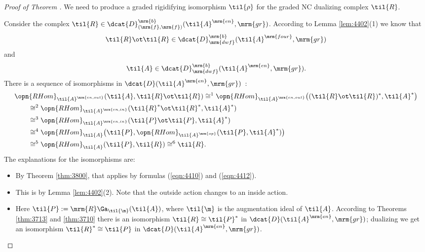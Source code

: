 \begin{proof}[Proof of Theorem \tup{\ref{thm:4400}}]
We need to produce a graded rigidifying isomorphism $\til{\rho}$ for the graded 
NC dualizing complex $\til{R}$. 

Consider the complex 
$\til{R} \in \dcat{D}^{\mrm{b}}_{(\mrm{f}, \mrm{f})}(\til{A}^{\mrm{en}}, 
\mrm{gr})$.
According to Lemma \ref{lem:4402}(1) we know that 
\begin{equation} \label{eqn:4410}
\til{R} \ot \til{R} \in 
\dcat{D}^{\mrm{b}}_{\mrm{dwf}}(\til{A}^{\mrm{four}}, \mrm{gr})  
\end{equation}
and 
\begin{equation} \label{eqn:4412}
\til{A} \in \dcat{D}^{\mrm{b}}_{\mrm{dwf}}(\til{A}^{\mrm{en}}, \mrm{gr}) . 
\end{equation}
There is a sequence of isomorphisms in 
$\dcat{D}(\til{A}^{\mrm{en}}, \mrm{gr})$~:
\begin{equation} \label{eqn:4413}
\begin{aligned}
& \opn{RHom}_{\til{A}^{\mrm{en, out}}}(\til{A}, \til{R} \ot \til{R})
\cong^{1}
\opn{RHom}_{\til{A}^{\mrm{en, out}}} \bigl( (\til{R} \ot \til{R})^*, \til{A}^* 
\bigr)
\\
& \qquad \cong^{2}
\opn{RHom}_{\til{A}^{\mrm{en, in}}}(\til{R}^* \ot \til{R}^*, \til{A}^*)
\\
& \qquad \cong^{3}
\opn{RHom}_{\til{A}^{\mrm{en, in}}}(\til{P} \ot \til{P}, \til{A}^*) 
\\
& \qquad \cong^{4}
\opn{RHom}_{\til{A}} \bigl( \til{P} , 
\opn{RHom}_{\til{A}^{\mrm{op}}} (\til{P}, \til{A}^*) \bigr) 
\\
& \qquad \cong^{5}
\opn{RHom}_{\til{A}} (\til{P}, \til{R} ) \cong^{6} \til{R} . 
\end{aligned}
\end{equation}
The explanations for the isomorphisms are:
\begin{itemize}
\item[$\cong^{1}$~:] By Theorem \ref{thm:3800}, that applies by formulas 
(\ref{eqn:4410}) and (\ref{eqn:4412}).  

\item[$\cong^{2}$~:] This is by Lemma \ref{lem:4402}(2). Note that the outside 
action changes to an inside action. 

\item[$\cong^{3}$~:] Here 
$\til{P} := \mrm{R} \Ga_{\til{\m}}(\til{A})$, where $\til{\m}$ is the 
augmentation ideal of $\til{A}$. According to Theorems \ref{thm:3713} and 
\ref{thm:3710} there is an isomorphism 
$\til{R} \cong \til{P}^*$
in $\dcat{D}(\til{A}^{\mrm{en}}, \mrm{gr})$; dualizing we get 
an isomorphism $\til{R}^* \cong \til{P}$ in 
$\dcat{D}(\til{A}^{\mrm{en}}, \mrm{gr})$. 


\end{itemize}
\end{proof}
